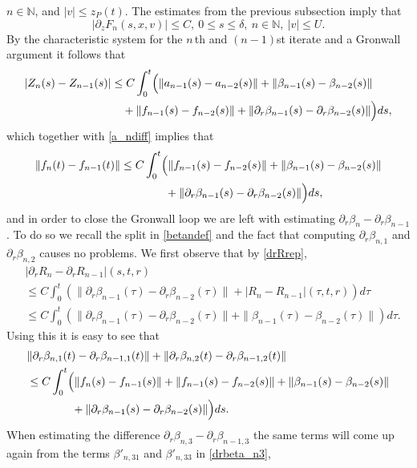 \documentclass[11pt]{article}
\def\N{\mathbb N}
\begin{document}
$n\in \N$, and $|v|\leq z_P(t)$. The estimates from the previous subsection
imply that
\[
|\partial_z F_n(s,x,v)|\leq C,\ 0\leq s\leq \delta,\ n\in \N,\ |v|\leq U.
\]
By the characteristic system for the $n\,$th and $(n-1)$st iterate
and a Gronwall argument it follows that
\begin{align*}
  |Z_n(s) - Z_{n-1}(s)|
  &\leq
  C \int_0^t\Bigl(\|a_{n-1}(s)-a_{n-2}(s)\| + \|\beta_{n-1}(s)-\beta_{n-2}(s)\|\\
  &\quad {}+ \|f_{n-1}(s)-f_{n-2}(s)\|
  + \|\partial_r\beta_{n-1}(s)-\partial_r\beta_{n-2}(s)\|\Bigr) ds,
\end{align*}
which together with \eqref{a_ndiff} implies that
\begin{align}\label{f_ndiff}
  \|f_n(t) - f_{n-1}(t)\|
  &\leq
  C \int_0^t\Bigl(\|f_{n-1}(s)-f_{n-2}(s)\| + \|\beta_{n-1}(s)-\beta_{n-2}(s)\|
  \notag\\
  &\qquad\qquad {}
  + \|\partial_r\beta_{n-1}(s)-\partial_r\beta_{n-2}(s)\|\Bigr) ds,
\end{align}
and in order to close the Gronwall loop
we are left with estimating $\partial_r\beta_{n}-\partial_r\beta_{n-1}$.
To do so we recall the split in \eqref{betandef} and the fact that
computing $\partial_r \beta_{n,1}$ and $\partial_r \beta_{n,2}$ causes no
problems. We first observe that by \eqref{drRrep},
\begin{align*}
  &|\partial_r R_n-\partial_r R_{n-1}|(s,t,r)\\
  &\leq
  C \int_0^t \left(\|\partial_r\beta_{n-1}(\tau)-\partial_r\beta_{n-2}(\tau)\|
  + |R_{n}-R_{n-1}|(\tau,t,r) \right)d\tau\\
  &\leq
  C \int_0^t \left(\|\partial_r\beta_{n-1}(\tau)-\partial_r\beta_{n-2}(\tau)\|
  + \|\beta_{n-1}(\tau)-\beta_{n-2}(\tau)\|\right)d\tau .
\end{align*}
Using this it is easy to see that
\begin{align}\label{b_n12diff}
  &\|\partial_r \beta_{n,1}(t) - \partial_r \beta_{n-1,1}(t)\|
  + \|\partial_r \beta_{n,2}(t) - \partial_r \beta_{n-1,2}(t)\|\notag \\
  &\leq
  C \int_0^t\Bigl(\|f_{n}(s)-f_{n-1}(s)\| +\|f_{n-1}(s)-f_{n-2}(s)\| +
  \|\beta_{n-1}(s)-\beta_{n-2}(s)\|
  \notag\\
  &\qquad\qquad {}
  + \|\partial_r\beta_{n-1}(s)-\partial_r\beta_{n-2}(s)\|\Bigr) ds.
\end{align}
When estimating the difference
$\partial_r \beta_{n,3} - \partial_r \beta_{n-1,3}$
the same terms will come up again
from the terms $\beta'_{n,31}$ and $\beta'_{n,33}$ in \eqref{drbeta_n3},
\end{document}
